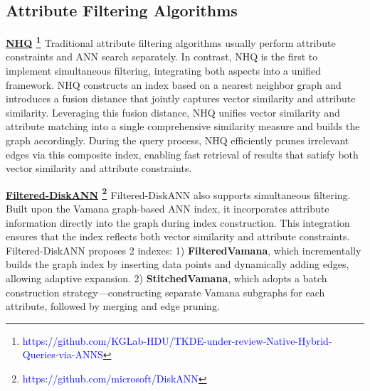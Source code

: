 \documentclass[sigconf, nonacm]{acmart}
\begin{document}
{	\subsection{Attribute Filtering Algorithms}
	

	\noindent\textbf{\underline{NHQ} \footnote{\textcolor{blue}{https://github.com/KGLab-HDU/TKDE-under-review-Native-Hybrid-Queries-via-ANNS}} \cite{NHQ}}
	Traditional attribute filtering algorithms usually perform attribute constraints and ANN search separately. In contrast, NHQ is the first to implement simultaneous filtering, integrating both aspects into a unified framework. NHQ constructs an index based on a nearest neighbor graph and introduces a fusion distance that jointly captures vector similarity and attribute similarity. Leveraging this fusion distance, NHQ unifies vector similarity and attribute matching into a single comprehensive similarity measure and builds the graph accordingly. During the query process, NHQ efficiently prunes irrelevant edges via this composite index, enabling fast retrieval of results that satisfy both vector similarity and attribute constraints.
	
	\noindent\textbf{\underline{Filtered-DiskANN} \footnote{\textcolor{blue}{https://github.com/microsoft/DiskANN}} \cite{Filtered-diskann}}
	Filtered-DiskANN also supports simultaneous filtering. Built upon the Vamana \cite{diskann} graph-based ANN index, it incorporates attribute information directly into the graph during index construction. This integration ensures that the index reflects both vector similarity and attribute constraints. 
	Filtered-DiskANN proposes 2 indexes:  
	1) \textbf{FilteredVamana}, which incrementally builds the graph index by inserting data points and dynamically adding edges, allowing adaptive expansion.  
	2) \textbf{StitchedVamana}, which adopts a batch construction strategy—constructing separate Vamana subgraphs for each attribute, followed by merging and edge pruning.
	
}
\end{document}
